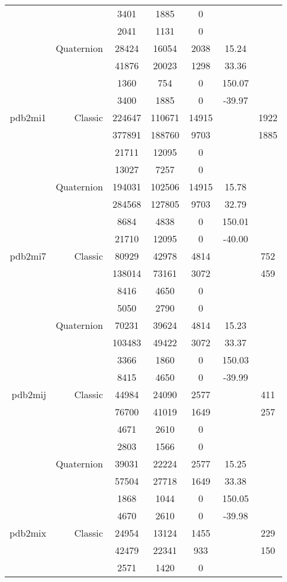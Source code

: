\begin{xltabular}{\textwidth}{r|rcccSc}
& & 3401 & 1885 & 0 & & \\
& & 2041 & 1131 & 0 & & \\
& Quaternion & 28424 & 16054 & 2038 & 15.24 & \\
& & 41876 & 20023 & 1298 & 33.36 & \\
& & 1360 & 754 & 0 & 150.07 & \\
& & 3400 & 1885 & 0 & -39.97 & \\ \addlinespace
pdb2mi1 & Classic & 224647 & 110671 & 14915 & & 1922 \\
& & 377891 & 188760 & 9703 & & 1885 \\
& & 21711 & 12095 & 0 & & \\
& & 13027 & 7257 & 0 & & \\
& Quaternion & 194031 & 102506 & 14915 & 15.78 & \\
& & 284568 & 127805 & 9703 & 32.79 & \\
& & 8684 & 4838 & 0 & 150.01 & \\
& & 21710 & 12095 & 0 & -40.00 & \\ \addlinespace
pdb2mi7 & Classic & 80929 & 42978 & 4814 & & 752 \\
& & 138014 & 73161 & 3072 & & 459 \\
& & 8416 & 4650 & 0 & & \\
& & 5050 & 2790 & 0 & & \\
& Quaternion & 70231 & 39624 & 4814 & 15.23 & \\
& & 103483 & 49422 & 3072 & 33.37 & \\
& & 3366 & 1860 & 0 & 150.03 & \\
& & 8415 & 4650 & 0 & -39.99 & \\ \addlinespace
pdb2mij & Classic & 44984 & 24090 & 2577 & & 411 \\
& & 76700 & 41019 & 1649 & & 257 \\
& & 4671 & 2610 & 0 & & \\
& & 2803 & 1566 & 0 & & \\
& Quaternion & 39031 & 22224 & 2577 & 15.25 & \\
& & 57504 & 27718 & 1649 & 33.38 & \\
& & 1868 & 1044 & 0 & 150.05 & \\
& & 4670 & 2610 & 0 & -39.98 & \\ \addlinespace
pdb2mix & Classic & 24954 & 13124 & 1455 & & 229 \\
& & 42479 & 22341 & 933 & & 150 \\
& & 2571 & 1420 & 0 & & \\

\end{xltabular}
